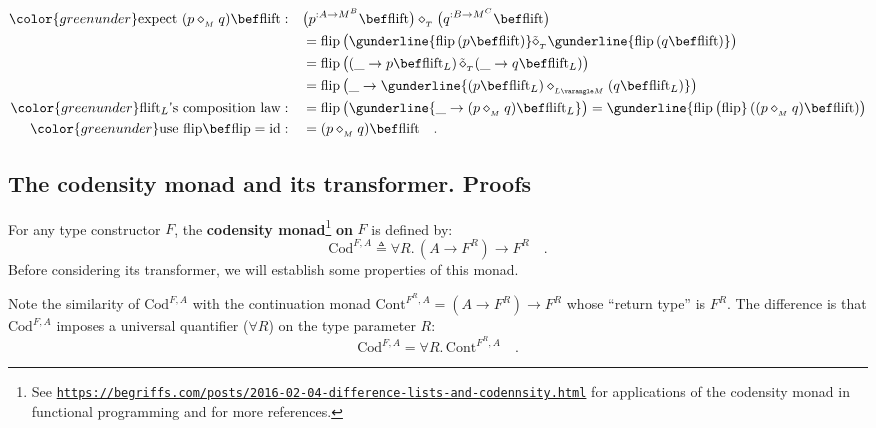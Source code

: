 \begin{align*}
{\color{greenunder}\text{expect }(p\diamond_{_{M}}q)\bef\text{flift}:}\quad & \big(p^{:A\rightarrow M^{B}}\bef\text{flift}\big)\diamond_{_{T}}\big(q^{:B\rightarrow M^{C}}\bef\text{flift}\big)\\
 & =\text{flip}\,\big(\gunderline{\text{flip}\,(p\bef\text{flift})}\tilde{\diamond}_{_{T}}\gunderline{\text{flip}\,(q\bef\text{flift})}\big)\\
 & =\text{flip}\,\big((\_\rightarrow p\bef\text{flift}_{L})\,\tilde{\diamond}_{_{T}}(\_\rightarrow q\bef\text{flift}_{L})\big)\\
 & =\text{flip}\,\big(\_\rightarrow\gunderline{(p\bef\text{flift}_{L})\diamond_{_{L\varangle M}}(q\bef\text{flift}_{L})}\big)\\
{\color{greenunder}\text{flift}_{L}\text{\textsf{'}s composition law}:}\quad & =\text{flip}\,\big(\gunderline{\_\rightarrow(p\diamond_{_{M}}q)\bef\text{flift}_{L}}\big)=\gunderline{\text{flip}\,\big(\text{flip}}\,((p\diamond_{_{M}}q)\bef\text{flift})\big)\\
{\color{greenunder}\text{use }\text{flip}\bef\text{flip}=\text{id}:}\quad & =(p\diamond_{_{M}}q)\bef\text{flift}\quad.
\end{align*}


\subsection{The codensity monad and its transformer. Proofs\label{subsec:The-codensity-monad}}

For any type constructor $F$, the \textbf{codensity
monad}\footnote{See \texttt{\href{https://begriffs.com/posts/2016-02-04-difference-lists-and-codennsity.html}{https://begriffs.com/posts/2016-02-04-difference-lists-and-codennsity.html}}
for applications of the codensity monad in functional programming
and for more references.} \textbf{on} $F$ is defined by:
\[
\text{Cod}^{F,A}\triangleq\forall R.\,(A\rightarrow F^{R})\rightarrow F^{R}\quad.
\]
Before considering its transformer, we will establish some properties
of this monad.

Note the similarity of $\text{Cod}^{F,A}$ with the continuation monad
$\text{Cont}^{F^{R},A}=(A\rightarrow F^{R})\rightarrow F^{R}$ whose
\textsf{``}return type\textsf{''} is $F^{R}$. The difference is that $\text{Cod}^{F,A}$
imposes a universal quantifier ($\forall R$) on the type parameter
$R$:
\[
\text{Cod}^{F,A}=\forall R.\,\text{Cont}^{F^{R},A}\quad.
\]

